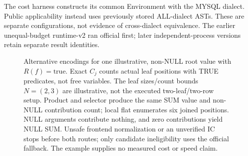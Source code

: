 \documentclass[3p,times,authoryear]{elsarticle}
\newcommand{\ind}[1]{\mathbf{1}[#1]}
\newcommand{\ite}{\operatorname{If}}
\begin{document}
The cost harness constructs its common Environment with the MYSQL dialect. Public applicability instead uses previously stored ALL-dialect ASTs. These are separate configurations, not evidence of cross-dialect equivalence. The earlier unequal-budget runtime-v2 ran official first; later independent-process versions retain separate result identities.

\begin{figure}[!htbp]
\centering
{}
\caption{Alternative encodings for one illustrative, non-NULL root value with $R(f)=\mathrm{true}$. Exact $C_j$ counts actual leaf positions with TRUE predicates, not free variables. The leaf sizes/count bounds $N=(2,3)$ are illustrative, not the executed two-leaf/two-row setup. Product and selector produce the same SUM value and non-NULL contribution count; local flat enumerates six joined positions. NULL arguments contribute nothing, and zero contributions yield NULL SUM. Unsafe frontend normalization or an unverified IC stops before both routes; only candidate ineligibility uses the official fallback. The example supplies no measured cost or speed claim.}\label{fig:interface}
\end{figure}
\end{document}
